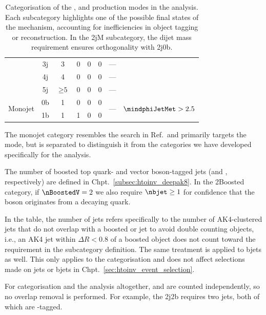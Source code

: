 \begin{table}[htbp]
\begin{tabular}{cccccccc}
        & 3j & 3 & 0 & 0 & 0 & ---\\
        & 4j & 4 & 0 & 0 & 0 & ---\\
        & 5j & $\geq \text{5}$ & 0 & 0 & 0 & ---\\\hline
        \multirow{2}{*}{Monojet}& 0b & 1 & 0 & 0 & 0 & \multirow{2}{*}{---} & \multirow{2}{*}{$\mindphiJetMet > \text{2.5}$}\\ %
        & 1b & 1 & 1 & 0 & 0 &  \\\hline\hline
    \end{tabular}
    \caption[Categorisation of the \ttH, \VH and \ggF production modes in the analysis]{Categorisation of the \ttH, \VH and \ggF production modes in the analysis. Each subcategory highlights one of the possible final states of the mechanism, accounting for inefficiencies in object tagging or reconstruction. In the \ggF 2jM subcategory, the dijet mass requirement ensures orthogonality with \VH 2j0b.}
    \label{tab:htoinv_categories}
\end{table}

The monojet category resembles the search in Ref.~and primarily targets the \ggF mode, but is separated to distinguish it from the categories we have developed specifically for the analysis.

The number of boosted top quark- and vector boson-tagged \glspl{jet} (\nBoostedTop and \nBoostedV, respectively) are defined in Chpt.~\ref{subsec:htoinv_deepak8}. In the \ttH 2Boosted category, if $\nBoostedV = \text{2}$ we also require $\nbjet \geq \text{1}$ for confidence that the \PVec boson originates from a decaying \Ptop quark.

In the table, the number of \glspl{jet} \njet refers specifically to the number of AK4-clustered \glspl{jet} that do not overlap with a boosted \Ptop or \PVec \gls{jet} to avoid double counting objects, i.e., an AK4 \gls{jet} within $\Delta R < \text{0.8}$ of a boosted object does not count toward the \njet requirement in the subcategory definition. The same treatment is applied to \glspl{bjet} as well. This only applies to the categorisation and does not affect selections made on \glspl{jet} or \glspl{bjet} in Chpt.~\ref{sec:htoinv_event_selection}.

For categorisation and the analysis altogether, \njet and \nbjet are counted independently, so no overlap removal is performed. For example, the \VH 2j2b requires two \glspl{jet}, both of which are \Pbottom-tagged.

